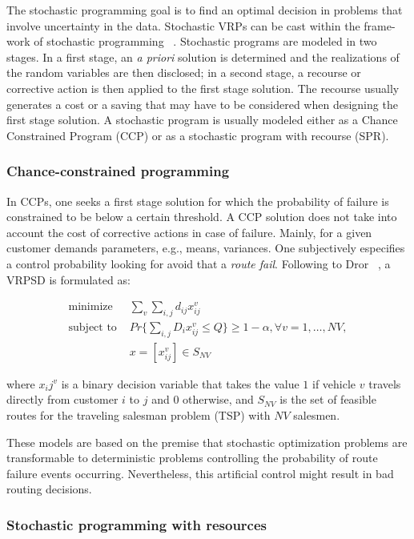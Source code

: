 The stochastic programming goal is to find an optimal decision in problems that involve uncertainty in the data. Stochastic VRPs can be cast within the frame-work of stochastic programming ~\cite{gendreau_stochastic_1996}. Stochastic programs are modeled in two stages. In a first stage, an \textit{a priori} solution is determined and the realizations of the random variables are then disclosed; in a second stage, a recourse or corrective action is then applied to the first stage solution. The recourse usually generates a cost or a saving that may have to be considered when designing the first stage solution. A stochastic program is usually modeled either as a Chance Constrained Program (CCP) or as a stochastic program with recourse (SPR). 

 
\subsubsection{Chance-constrained programming}

In CCPs, one seeks a first stage solution for which the probability of failure is constrained to be below a certain threshold. A CCP solution does not take into account the cost of corrective actions in case of failure. Mainly, for a given customer demands parameters, e.g., means, variances. One subjectively especifies a control probability looking for avoid that a \textit{route fail}. Following to Dror ~\cite{Dror_2005}, a VRPSD is formulated as:

\begin{align}\label{eq:CCP}
 \text{minimize } & \sum_v\sum_{i,j}d_{ij}x_{ij}^v\\
 \text{subject to } & Pr\{\sum_{i,j}D_ix_{ij}^v \leq Q\} \geq 1-\alpha, \forall v = 1,\ldots,NV,\\
  & x = [x_{ij}^v] \in S_{NV}
\end{align}

where $x_ij^v$ is a binary decision variable that takes the value $1$ if vehicle $v$ travels directly from customer $i$ to $j$ and $0$ otherwise, and $S_{NV}$ is the set of feasible routes for the traveling salesman problem (TSP) with $NV$ salesmen.

These models are based on the premise that stochastic optimization problems are transformable to deterministic problems controlling the probability of route failure events occurring. Nevertheless, this artificial control might result in bad routing decisions.


\subsubsection{Stochastic programming with resources}

